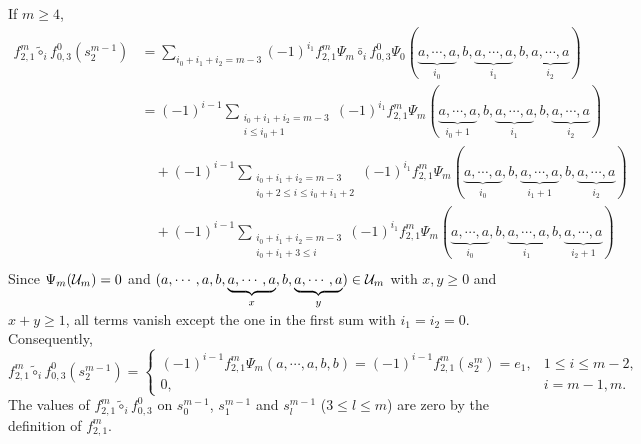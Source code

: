 \documentclass[10pt, reqno]{amsart}
\theoremstyle{definition}
\theoremstyle{remark}
\numberwithin{equation}{section}
\begin{document}
If \(m\ge 4\),
\[\begin{aligned}
    f_{2,1}^m \tilde{\circ}_i f_{0,3}^0(s_2^{m-1}) 
    &=\sum_{i_0+i_1+i_2=m-3}(-1)^{i_1} f_{2,1}^m\Psi_m \bar{\circ}_i f_{0,3}^0\Psi_0(\underbrace{a,\cdots,a}_{i_0},b,\underbrace{a,\cdots,a}_{i_1},b,\underbrace{a,\cdots,a}_{i_2})\\
    &=(-1)^{i-1}\sum_{\substack{i_0+i_1+i_2=m-3\\ i\le i_0+1}}(-1)^{i_1}f_{2,1}^m\Psi_m(\underbrace{a,\cdots,a}_{i_0+1},b,\underbrace{a,\cdots,a}_{i_1},b,\underbrace{a,\cdots,a}_{i_2})\\
     & \quad +(-1)^{i-1}\sum_{\substack{i_0+i_1+i_2=m-3\\ i_0+2\le i\le i_0+i_1+2}}(-1)^{i_1}f_{2,1}^m\Psi_m(\underbrace{a,\cdots,a}_{i_0},b,\underbrace{a,\cdots,a}_{i_1+1},b,\underbrace{a,\cdots,a}_{i_2})\\
     & \quad +(-1)^{i-1}\sum_{\substack{i_0+i_1+i_2=m-3\\ i_0+i_1+3\le i}}(-1)^{i_1}f_{2,1}^m\Psi_m(\underbrace{a,\cdots,a}_{i_0},b,\underbrace{a,\cdots,a}_{i_1},b,\underbrace{a,\cdots,a}_{i_2+1})\\
\end{aligned}\]
Since \(\Psi_m(\mathcal{U}_m)=0\) and \((a,\cdots,a,b,\underbrace{a,\cdots,a}_x,b,\underbrace{a,\cdots,a}_y)\in \mathcal{U}_m\) with \(x,y \ge 0\) and \(x+y\ge 1\), all terms vanish except the one  in the first sum with \(i_1=i_2=0\). Consequently, 
\[     f_{2,1}^m \tilde{\circ}_i f_{0,3}^0(s_2^{m-1}) = \begin{cases}
         (-1)^{i-1}f_{2,1}^m\Psi_m(a,\cdots,a,b,b)= (-1)^{i-1}f_{2,1}^m(s_2^m)=e_1, & 1\le i\le m-2,\\
         0, & i=m-1,m.
     \end{cases}\]
The values of \(f_{2,1}^m \tilde{\circ}_i f_{0,3}^0\) on \(s_0^{m-1}\), \(s_1^{m-1}\) and \(s_l^{m-1}\) (\(3\le l \le m\)) are zero by the definition of \(f_{2,1}^m\).
\end{document}
